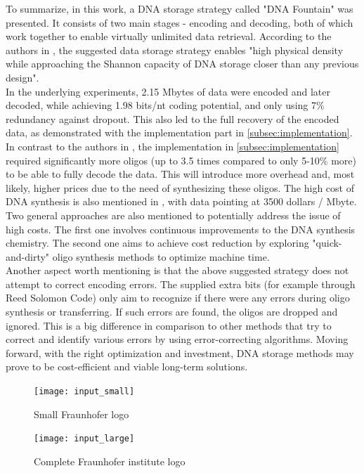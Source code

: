 \documentclass[12pt]%
{article}
\begin{document}
To summarize, in this work, a DNA storage strategy called "DNA Fountain" was presented. It consists of two main stages - encoding and decoding, both of which work together to enable virtually unlimited data retrieval. According to the authors in \cite{erlich2017dna}, the suggested data storage strategy enables "high physical density while approaching the Shannon capacity of DNA storage closer than any previous design".\\ 
In the underlying experiments, 2.15 Mbytes of data were encoded and later decoded, while achieving 1.98 bits/nt coding potential, and only using 7\% redundancy against dropout. This also led to the full recovery of the encoded data, as demonstrated with the implementation part in \ref{subsec:implementation}. In contrast to the authors in \cite{erlich2017dna}, the implementation in \ref{subsec:implementation} required significantly more oligos (up to 3.5 times compared to only 5-10\% more) to be able to fully decode the data. This will introduce more overhead and, most likely, higher prices due to the need of  synthesizing these oligos. The high cost of DNA synthesis is also mentioned in \cite{erlich2017dna}, with data pointing at 3500 dollars / Mbyte. Two general approaches are also mentioned to potentially address the issue of high costs. The first one involves continuous improvements to the DNA synthesis chemistry. The second one aims to achieve cost reduction by exploring "quick-and-dirty" oligo synthesis methods to optimize machine time. \\
Another aspect worth mentioning is that the above suggested strategy does not attempt to correct encoding errors. The supplied extra bits (for example through Reed Solomon Code) only aim to recognize if there were any errors during oligo synthesis or transferring. If such errors are found, the oligos are dropped and ignored. This is a big difference in comparison to other methods that try to correct and identify various errors by using error-correcting algorithms. Moving forward, with the right optimization and investment, DNA storage methods may prove to be cost-efficient and viable long-term solutions.

\begin{figure}[h]
    \centering
    \texttt{[image: input\_small]}
    \caption{Small Fraunhofer logo}
    \label{fig:logo_short}
\end{figure}


\begin{figure}[h]
    \centering
    \texttt{[image: input\_large]}
    \caption{Complete Fraunhofer institute logo}
    \label{fig:logo_long}
\end{figure}




\clearpage
\newpage



\end{document}
